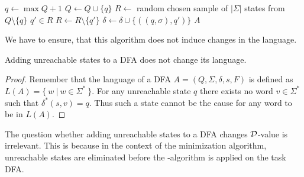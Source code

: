 \vspace{0.2cm}
\begin{algorithmic}[1]
		\State $q \gets \max Q + 1$
		\State $Q \gets Q \cup \{ q \}$
		\State $R \gets$ random chosen sample of $|\Sigma|$ states from $Q \setminus \{q\}$
			\State $q' \in R$
			\State $R \gets R \setminus \{q'\}$
			\State $\delta \gets \delta \cup \{ ((q, \sigma), q') \}$
		\EndFor
	\EndFor
	\State \Return $A$
	\EndFunction
\end{algorithmic}
\vspace{0.2cm}

\noindent We have to ensure, that this algorithm does not induce changes in the language.
\begin{lemma}
	Adding unreachable states to a DFA does not change its language.
\end{lemma}
\begin{proof}
	Remember that the language of a DFA $A = (Q, \Sigma, \delta, s, F)$ is defined as $L(A) = \{\ w\ |\ w \in \Sigma^* \ \}$. For any unreachable state $q$ there exists no word $v \in \Sigma^*$ such that $\delta^*(s,v) = q$. Thus such a state cannot be the cause for any word to be in $L(A)$.
\end{proof}

\noindent The question whether adding unreachable states to a DFA changes $\mathcal{D}$-value is irrelevant. This is because in the context of the minimization algorithm, unreachable states are eliminated before the \CompDist-algorithm is applied on the task DFA.
